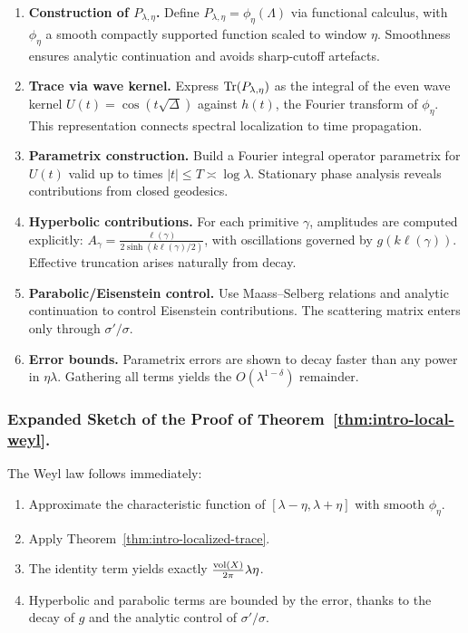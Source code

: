 \begin{enumerate}[label=\arabic*.]
  \item \textbf{Construction of $P_{\lambda,\eta}$.}
        Define $P_{\lambda,\eta}=\phi_\eta(\Lambda)$ via functional calculus,
        with $\phi_\eta$ a smooth compactly supported function scaled to window $\eta$.
        Smoothness ensures analytic continuation and avoids sharp-cutoff artefacts.
  \item \textbf{Trace via wave kernel.}
        Express $\operatorname{Tr}(P_{\lambda,\eta})$ as the integral of the even wave kernel
        $U(t)=\cos(t\sqrt{\Delta})$ against $h(t)$, the Fourier transform of $\phi_\eta$.
        This representation connects spectral localization to time propagation.
  \item \textbf{Parametrix construction.}
        Build a Fourier integral operator parametrix for $U(t)$
        valid up to times $|t|\le T\asymp\log\lambda$.
        Stationary phase analysis reveals contributions from closed geodesics.
  \item \textbf{Hyperbolic contributions.}
        For each primitive $\gamma$, amplitudes are computed explicitly:
        $A_\gamma = \frac{\ell(\gamma)}{2\sinh(k\ell(\gamma)/2)}$,
        with oscillations governed by $g(k\ell(\gamma))$.
        Effective truncation arises naturally from decay.
  \item \textbf{Parabolic/Eisenstein control.}
        Use Maass–Selberg relations and analytic continuation
        to control Eisenstein contributions.
        The scattering matrix enters only through $\sigma'/\sigma$.
  \item \textbf{Error bounds.}
        Parametrix errors are shown to decay faster than any power in $\eta\lambda$.
        Gathering all terms yields the $O(\lambda^{1-\delta})$ remainder.
\end{enumerate}

\subsubsection*{Expanded Sketch of the Proof of Theorem~\ref{thm:intro-local-weyl}.}
The Weyl law follows immediately:
\begin{enumerate}[label=\arabic*.]
  \item Approximate the characteristic function of $[\lambda-\eta,\lambda+\eta]$
        with smooth $\phi_\eta$.
  \item Apply Theorem~\ref{thm:intro-localized-trace}.
  \item The identity term yields exactly $\frac{\operatorname{vol}(X)}{2\pi}\lambda\eta$.
  \item Hyperbolic and parabolic terms are bounded by the error,
        thanks to the decay of $g$ and the analytic control of $\sigma'/\sigma$.
\end{enumerate}

